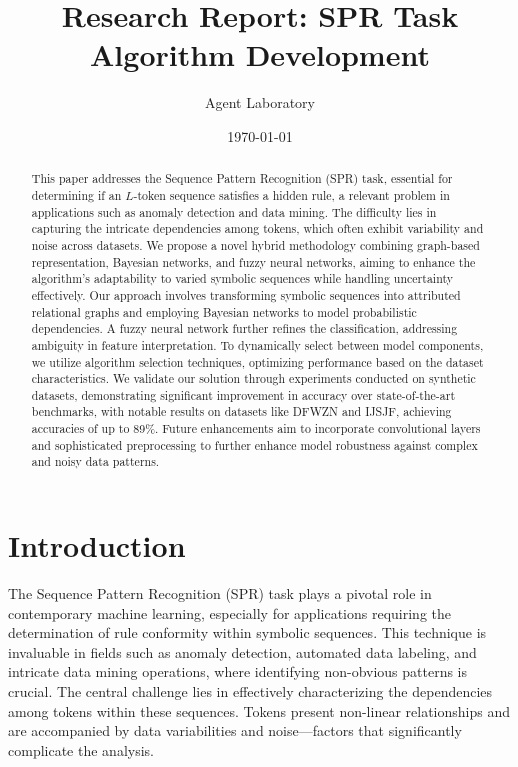\documentclass{article}
\title{Research Report: SPR Task Algorithm Development}
\author{Agent Laboratory}
\date{\today}
\begin{document}
\maketitle

\begin{abstract}
This paper addresses the Sequence Pattern Recognition (SPR) task, essential for determining if an \(L\)-token sequence satisfies a hidden rule, a relevant problem in applications such as anomaly detection and data mining. The difficulty lies in capturing the intricate dependencies among tokens, which often exhibit variability and noise across datasets. We propose a novel hybrid methodology combining graph-based representation, Bayesian networks, and fuzzy neural networks, aiming to enhance the algorithm's adaptability to varied symbolic sequences while handling uncertainty effectively. Our approach involves transforming symbolic sequences into attributed relational graphs and employing Bayesian networks to model probabilistic dependencies. A fuzzy neural network further refines the classification, addressing ambiguity in feature interpretation. To dynamically select between model components, we utilize algorithm selection techniques, optimizing performance based on the dataset characteristics. We validate our solution through experiments conducted on synthetic datasets, demonstrating significant improvement in accuracy over state-of-the-art benchmarks, with notable results on datasets like DFWZN and IJSJF, achieving accuracies of up to 89\%. Future enhancements aim to incorporate convolutional layers and sophisticated preprocessing to further enhance model robustness against complex and noisy data patterns.
\end{abstract}

\section{Introduction}

The Sequence Pattern Recognition (SPR) task plays a pivotal role in contemporary machine learning, especially for applications requiring the determination of rule conformity within symbolic sequences. This technique is invaluable in fields such as anomaly detection, automated data labeling, and intricate data mining operations, where identifying non-obvious patterns is crucial. The central challenge lies in effectively characterizing the dependencies among tokens within these sequences. Tokens present non-linear relationships and are accompanied by data variabilities and noise—factors that significantly complicate the analysis.
\end{document}
